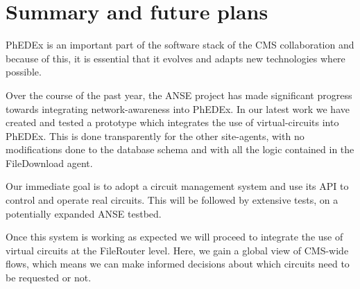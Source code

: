 \section{Summary and future plans}

PhEDEx is an important part of the software stack of the CMS collaboration and
because of this, it is essential that it evolves and adapts new technologies 
where possible. 

Over the course of the past year, the ANSE project has made significant progress
towards integrating network-awareness into PhEDEx. In our latest work we have
created and tested a prototype which integrates the use of virtual-circuits into
PhEDEx. This is done transparently for the other site-agents, with no modifications
done to the database schema and with all the logic contained in the FileDownload
agent.

Our immediate goal is to adopt a circuit management system and use its API to
control and operate real circuits. This will be followed by extensive tests, on 
a potentially expanded ANSE testbed.

Once this system is working as expected we will proceed to integrate the use
of virtual circuits at the FileRouter level. Here, we gain a global view of 
CMS-wide flows, which means we can make informed decisions about which circuits
need to be requested or not.
